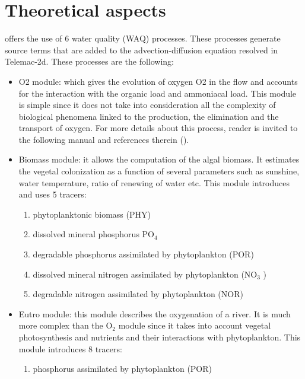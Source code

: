 \chapter{Theoretical aspects}

 \waqtel offers the use of 6 water quality (WAQ) processes. These processes generate source terms that are added to the advection-diffusion equation resolved in Telemac-2d. These processes are the following:

\begin{itemize}
\item  O2 module:  which gives the evolution of oxygen O2 in the flow and accounts for the interaction with the organic load and ammoniacal load. This module is simple since it does not take into consideration all the complexity of biological phenomena linked to the production, the elimination and the transport of oxygen. For more details about this process, reader is invited to the following manual and references therein (\cite{El-Kadi2012}).

\item  Biomass module:  it allows the computation of the algal biomass. It estimates the vegetal colonization as a function of several parameters such as sunshine, water temperature, ratio of renewing of water etc. This module introduces and uses 5 tracers:

\begin{enumerate}
\item  phytoplanktonic biomass (PHY)

\item  dissolved mineral phosphorus PO${}_{4}$

\item  degradable phosphorus assimilated by phytoplankton (POR)

\item  dissolved mineral nitrogen assimilated by phytoplankton (NO${}_{3}$ )

\item  degradable nitrogen assimilated by phytoplankton (NOR)
\end{enumerate}

\item  Eutro module:  this module describes the oxygenation of a river. It is much more complex than the O${}_{2}$ module since it takes into account vegetal photosynthesis and nutrients and their interactions with phytoplankton. This module introduces 8 tracers:
\begin{enumerate}
\item  phosphorus assimilated by phytoplankton (POR)


\end{enumerate}
\end{itemize}
